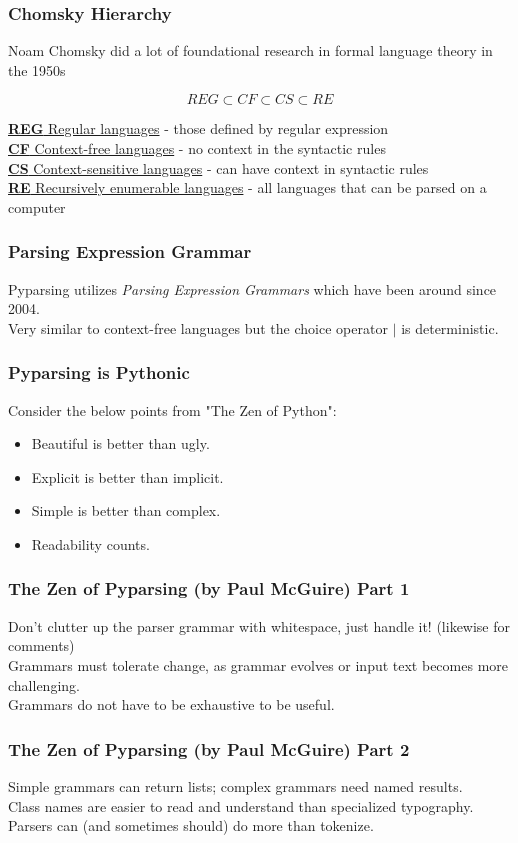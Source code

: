 \documentclass{beamer}
\begin{document}
\begin{frame}
\frametitle{Chomsky Hierarchy}
Noam Chomsky did a lot of foundational research in formal language theory in the 1950s

$$REG \subset CF \subset CS \subset RE$$

\underline{\textbf{REG} Regular languages} - those defined by regular expression \\ \medskip
\underline{\textbf{CF} Context-free languages} - no context in the syntactic rules \\ \medskip
\underline{\textbf{CS} Context-sensitive languages} - can have context in syntactic rules \\ \medskip
\underline{\textbf{RE} Recursively enumerable languages} - all languages that can be parsed on a computer
\end{frame}

\begin{frame}
\frametitle{Parsing Expression Grammar}
Pyparsing utilizes \textit{Parsing Expression Grammars} which have been around since 2004. \\
\medskip
Very similar to context-free languages but the choice operator $|$ is deterministic.
\end{frame}

\begin{frame}
\frametitle{Pyparsing is Pythonic}
Consider the below points from "The Zen of Python": \\
\bigskip
\begin{itemize}
\item Beautiful is better than ugly.
\item Explicit is better than implicit.
\item Simple is better than complex.
\item Readability counts.
\end{itemize}
\end{frame}

\begin{frame}
\frametitle{The Zen of Pyparsing (by Paul McGuire) Part 1}
Don't clutter up the parser grammar with whitespace, just handle it! (likewise for comments) \\
\bigskip
Grammars must tolerate change, as grammar evolves or input text becomes more challenging. \\
\bigskip
Grammars do not have to be exhaustive to be useful. 
\end{frame}

\begin{frame}
\frametitle{The Zen of Pyparsing (by Paul McGuire) Part 2}
Simple grammars can return lists; complex grammars need named results. \\
\bigskip
Class names are easier to read and understand than specialized typography. \\
\bigskip
Parsers can (and sometimes should) do more than tokenize.
\end{frame}
\end{document}
